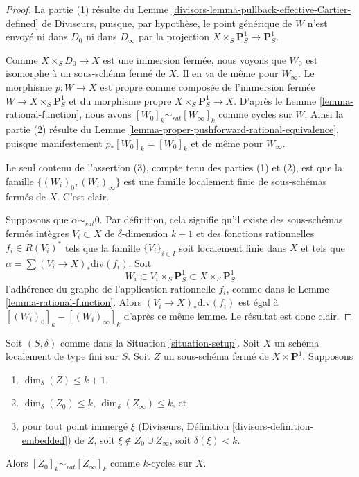 \begin{proof}
La partie (1) résulte du
Lemme \ref{divisors-lemma-pullback-effective-Cartier-defined} de Diviseurs,
puisque, par hypothèse, le point générique
de $W$ n'est envoyé ni dans $D_0$ ni dans $D_\infty$ par la projection
$X \times_S \mathbf{P}^1_S \to \mathbf{P}^1_S$.

\medskip\noindent
Comme $X \times_S D_0 \to X$ est une immersion fermée, nous voyons que $W_0$
est isomorphe à un sous-schéma fermé de $X$. Il en va de même pour $W_\infty$.
Le morphisme $p : W \to X$ est propre comme composée de
l'immersion fermée $W \to X \times_S \mathbf{P}^1_S$ et du
morphisme propre $X \times_S \mathbf{P}^1_S \to X$. D'après le
Lemme \ref{lemma-rational-function}, nous avons
$[W_0]_k \sim_{rat} [W_\infty]_k$ comme cycles sur $W$. Ainsi la partie (2) résulte du
Lemme \ref{lemma-proper-pushforward-rational-equivalence}, puisque manifestement
$p_*[W_0]_k = [W_0]_k$ et de même pour $W_\infty$.

\medskip\noindent
Le seul contenu de l'assertion (3), compte tenu des parties (1) et (2), est que
la famille $\{(W_i)_0, (W_i)_\infty\}$ est une famille localement finie
de sous-schémas fermés de $X$. C'est clair.

\medskip\noindent
Supposons que $\alpha \sim_{rat} 0$.
Par définition, cela signifie qu'il existe des sous-schémas fermés intègres
$V_i \subset X$ de $\delta$-dimension $k + 1$ et des fonctions rationnelles
$f_i \in R(V_i)^*$ tels que la famille
$\{V_i\}_{i \in I}$ soit localement finie dans $X$ et tels que
$\alpha = \sum (V_i \to X)_*\text{div}(f_i)$.
Soit
$$
W_i \subset V_i \times_S \mathbf{P}^1_S \subset X \times_S \mathbf{P}^1_S
$$
l'adhérence du graphe de l'application rationnelle $f_i$, comme dans le
Lemme \ref{lemma-rational-function}.
Alors $(V_i \to X)_*\text{div}(f_i)$
est égal à $[(W_i)_0]_k - [(W_i)_\infty]_k$ d'après ce même lemme.
Le résultat est donc clair.
\end{proof}

\begin{lemma}
\label{lemma-closed-subscheme-cross-p1}
Soit $(S, \delta)$ comme dans la Situation \ref{situation-setup}.
Soit $X$ un schéma localement de type fini sur $S$.
Soit $Z$ un sous-schéma fermé de $X \times \mathbf{P}^1$.
Supposons
\begin{enumerate}
\item $\dim_\delta(Z) \leq k + 1$,
\item $\dim_\delta(Z_0) \leq k$, $\dim_\delta(Z_\infty) \leq k$, et
\item pour tout point immergé $\xi$ (Diviseurs, Définition
\ref{divisors-definition-embedded}) de $Z$, soit
$\xi \not \in Z_0 \cup Z_\infty$, soit $\delta(\xi) < k$.
\end{enumerate}
Alors $[Z_0]_k \sim_{rat} [Z_\infty]_k$ comme $k$-cycles sur $X$.
\end{lemma}

